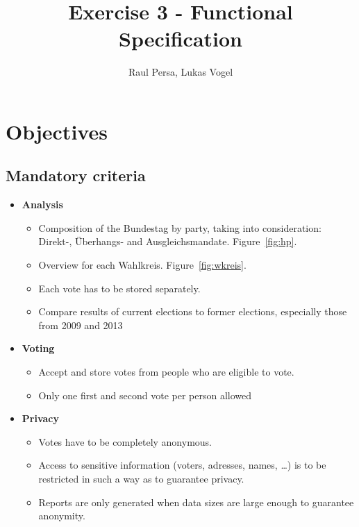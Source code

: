 \documentclass[10pt,a4paper]{article}
\author{Raul Persa, Lukas Vogel}
\title{Exercise 3 - Functional Specification}
\begin{document}
	\maketitle
	
\section{Objectives}

\subsection{Mandatory criteria}
	\begin{itemize}
		\item \textbf{Analysis}
			\begin{itemize}
				\item Composition of the Bundestag by party, taking into consideration: Direkt-, \"Uberhangs- and Ausgleichsmandate. Figure~\ref{fig:hp}.
			
				\item Overview for each Wahlkreis. Figure~\ref{fig:wkreis}.
			
				\item Each vote has to be stored separately.
			
				\item Compare results of current elections to former elections, especially those from 2009 and 2013
			\end{itemize}

		\item \textbf{Voting}
			\begin{itemize}
				\item Accept and store votes from people who are eligible to vote.
				
				\item Only one first and second vote per person allowed				
			\end{itemize}
		
		\item \textbf{Privacy}
			\begin{itemize}
				\item Votes have to be completely anonymous.
				\item Access to sensitive information (voters, adresses, names, \dots) is to be restricted in such a way as to guarantee privacy.
				\item Reports are only generated when data sizes are large enough to guarantee anonymity.
			\end{itemize}
			

\end{itemize}
\end{document}
